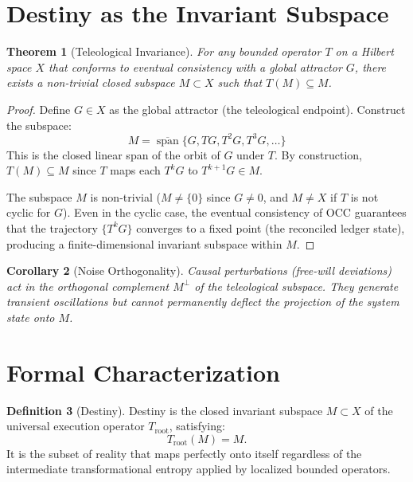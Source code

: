 \documentclass[12pt, a4paper]{article}
\theoremstyle{plain}
\newtheorem{theorem}{Theorem}[section]
\newtheorem{corollary}[theorem]{Corollary}
\theoremstyle{definition}
\newtheorem{definition}[theorem]{Definition}
\theoremstyle{remark}
\begin{document}
\section{Destiny as the Invariant Subspace}\label{sec:destiny}

\begin{theorem}[Teleological Invariance]\label{thm:invariance}
For any bounded operator $T$ on a Hilbert space $X$ that conforms to eventual consistency with a global attractor $G$, there exists a non-trivial closed subspace $M \subset X$ such that $T(M) \subseteq M$.
\end{theorem}

\begin{proof}
Define $G \in X$ as the global attractor (the teleological endpoint). Construct the subspace:
\begin{equation}
    M = \overline{\operatorname{span}}\{G, TG, T^2 G, T^3 G, \ldots\}
\end{equation}
This is the closed linear span of the orbit of $G$ under $T$. By construction, $T(M) \subseteq M$ since $T$ maps each $T^k G$ to $T^{k+1} G \in M$.

The subspace $M$ is non-trivial ($M \neq \{0\}$ since $G \neq 0$, and $M \neq X$ if $T$ is not cyclic for $G$). Even in the cyclic case, the eventual consistency of OCC guarantees that the trajectory $\{T^k G\}$ converges to a fixed point (the reconciled ledger state), producing a finite-dimensional invariant subspace within $M$.
\end{proof}

\begin{corollary}[Noise Orthogonality]
Causal perturbations (free-will deviations) act in the orthogonal complement $M^\perp$ of the teleological subspace. They generate transient oscillations but cannot permanently deflect the projection of the system state onto $M$.
\end{corollary}

\section{Formal Characterization}\label{sec:formalization}

\begin{definition}[Destiny]
Destiny is the closed invariant subspace $M \subset X$ of the universal execution operator $T_{\text{root}}$, satisfying:
\begin{equation}
    T_{\text{root}}(M) = M.
\end{equation}
It is the subset of reality that maps perfectly onto itself regardless of the intermediate transformational entropy applied by localized bounded operators.
\end{definition}
\end{document}
